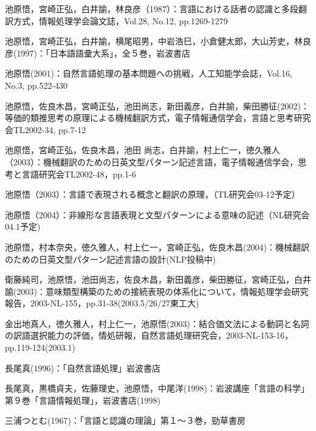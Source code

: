 \documentclass{nlp}
\begin{document}
\begin{thebibliography}{99}
\item
池原悟，宮崎正弘，白井諭，林良彦（1987）：言語における話者の認識と多段翻訳方式，情報処理学会論文誌，Vol.28, No.12, pp.1269-1279

\item
池原悟，宮崎正弘，白井諭，横尾昭男，中岩浩巳，小倉健太郎，大山芳史，林良彦(1997)：「日本語語彙大系」，全５巻，岩波書店

\item
池原悟(2001)：自然言語処理の基本問題への挑戦，人工知能学会誌，Vol.16, No.3, pp.522-430 

\item
池原悟，佐良木昌，宮崎正弘，池田尚志，新田義彦，白井諭，柴田勝征(2002)：等価的類推思考の原理による機械翻訳方式，電子情報通信学会，言語と思考研究会TL2002-34, pp.7-12 

\item
池原悟，宮崎正弘，佐良木昌，池田 尚志，白井諭，村上仁一，徳久雅人（2003）：機械翻訳のための日英文型パターン記述言語，電子情報通信学会，思考と言語研究会TL2002-48，pp.1-6 

\item
池原悟（2003）：言語で表現される概念と翻訳の原理，（TL研究会03-12予定）

\item
池原悟（2004）：非線形な言語表現と文型パターンによる意味の記述（NL研究会04.1予定)

\item
池原悟，村本奈央，徳久雅人，村上仁一，宮崎正弘，佐良木昌(2004)：機械翻訳のための日英文型パターン記述言語の設計(NLP投稿中)

\item
衛藤純司，池原悟，池田尚志，佐良木昌，新田義彦，柴田勝征，宮崎正弘，白井諭(2003)：意味類型構築のための接続表現の体系化について，情報処理学会研究報告，2003-NL-155，pp.31-38(2003.5/26/27東工大)

\item
金出地真人，徳久雅人，村上仁一，池原悟(2003)：結合価文法による動詞と名詞の訳語選択能力の評価，情処研報，自然言語処理研究会，2003-NL-153-16，pp.119-124(2003.1)

\item
長尾真(1996)：「自然言語処理」岩波書店

\item
長尾真，黒橋貞夫，佐藤理史，池原悟，中尾洋(1998)：岩波講座「言語の科学」第９巻「言語情報処理」，岩波書店(1998)

\item
三浦つとむ(1967)：「言語と認識の理論」第１〜３巻，勁草書房

\end{thebibliography}
\end{document}
